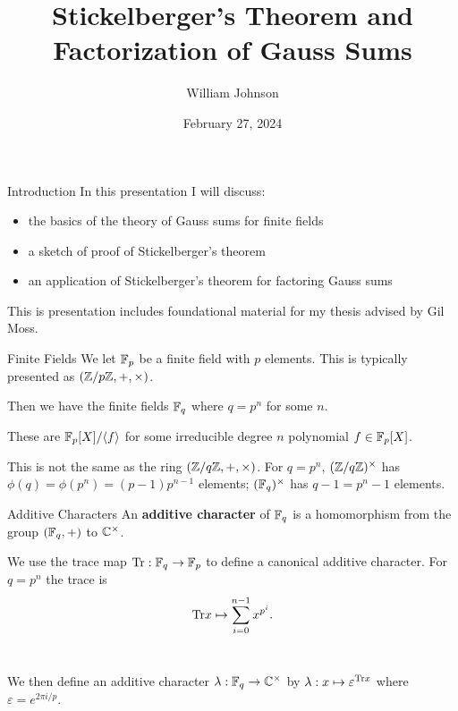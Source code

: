 \documentclass[presentation]{beamer}
\title[] %
{Stickelberger's Theorem and Factorization of Gauss Sums
}
\author[WJ]
{William Johnson
}
\institute[2024] 
{
 University of Maine
}
\date[Thesis 2024]
{February 27, 2024}
\begin{document}
\frame{\titlepage}


\begin{frame}{Introduction}
\bigskip
In this presentation I will discuss:
\begin{itemize}
    \item the basics of the theory of Gauss sums for finite fields
    
    \pause
    
    \item a sketch of proof of Stickelberger's theorem 
    \pause 
    
    \item an application of Stickelberger's theorem for factoring Gauss sums
    \pause 
\end{itemize}
\bigskip
This is presentation includes foundational material for my thesis advised by Gil Moss. 
\end{frame}


\begin{frame}{Finite Fields}
We let $\mathbb{F}_p$ be a finite field with $p$ elements. This is typically presented as $(\mathbb{Z} / p \mathbb{Z}, +, \times)$.\\

\pause
\vspace{0.5cm}

Then we have the finite fields $\mathbb{F}_q$ where $q = p^n$ for some $n$. 

\pause
\vspace{0.5cm}

These are $\mathbb{F}_p[X]/\langle f \rangle$ for some irreducible degree $n$ polynomial $f \in \mathbb{F}_p[X]$. \\

\pause
\vspace{0.5cm}

This is not the same as the ring $(\mathbb{Z}/ q \mathbb{Z}, +, \times)$. For $q = p^n$, $(\mathbb{Z}/q\mathbb{Z})^\times$ has $\phi(q) = \phi(p^n) = (p-1)p^{n-1}$ elements; $(\mathbb{F}_q)^\times$ has $q-1 = p^n - 1$ elements.
\end{frame}

\begin{frame}{Additive Characters}
An \textbf{additive character} of $\mathbb{F}_q$ is a homomorphism from the group $(\mathbb{F}_q, +)$ to $\mathbb{C}^\times$. \\

\pause 
\vspace{0.5cm}

We use the trace map $\textrm{Tr} : \mathbb{F}_q \to \mathbb{F}_p$ to define a canonical additive character. For $q = p^n$ the trace is \[\textrm{Tr} x \mapsto \sum_{i=0}^{n-1} x^{p^i}.\]\\

\pause 
\vspace{0.5cm}

We then define an additive character $\lambda : \mathbb{F}_q \to \mathbb{C}^\times$ by $\lambda : x \mapsto \varepsilon^{\textrm{Tr} x}$ where $\varepsilon = e^{2 \pi i /p}$. 

\end{frame}
\end{document}
